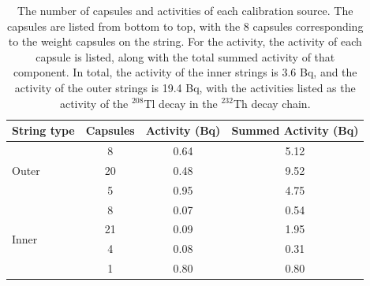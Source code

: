 \begin{table}[htbp]
    \centering
    \caption[The number of capsules and activities of each calibration source.]
    {The number of capsules and activities of each calibration source.
    The capsules are listed from bottom to top, with the 8 capsules corresponding to the weight capsules on the string.
    For the activity, the activity of each capsule is listed, along with the total summed activity of that component.
    In total, the activity of the inner strings is 3.6 Bq, and the activity of the outer strings is 19.4 Bq, with the activities listed as the activity of the $^{208}$Tl decay in the $^{232}$Th decay chain.}
    \label{tab:calibration_activities}
    \begin{tabular}{lccc}
    \hline 
    \hline
        String type & Capsules & Activity (Bq) & Summed Activity (Bq) \\
        \hline 
        \multirow{3}{*}{Outer} & 8 & 0.64 & 5.12 \\
        & 20 & 0.48 & 9.52 \\
        & 5 & 0.95 & 4.75 \\
        \hline
        \multirow{4}{*}{Inner} & 8 & 0.07 & 0.54 \\
        & 21 & 0.09 & 1.95 \\
        & 4 & 0.08 & 0.31 \\
        & 1 & 0.80 & 0.80 \\
        \hline
        \hline
    \end{tabular}
\end{table}

